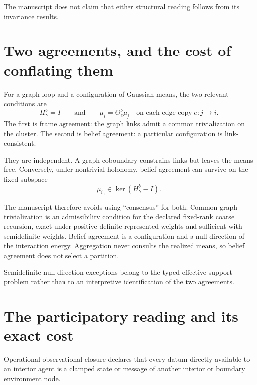 The manuscript does not claim that either structural reading follows from its
invariance results. 

\section{Two agreements, and the cost of conflating them}
\label{sec:phil-agreements}

For a graph loop and a configuration of Gaussian means, the two relevant
conditions are
\begin{equation}
H_\gamma^b=I
\qquad\text{and}\qquad
\mu_i=\Theta^b_e\mu_j\quad\text{on each edge copy }e:j\to i.
\label{eq:phil-two-agreements}
\end{equation}
The first is frame agreement: the graph links admit a common trivialization
on the cluster.  The second is belief agreement: a particular configuration
is link-consistent. 

They are independent. A graph coboundary constrains links but leaves the means
free. Conversely, under nontrivial holonomy, belief agreement can survive on
the fixed subspace
\begin{equation}
\mu_{i_0}\in\ker(H_\gamma^b-I).
\label{eq:phil-agreement-kernel}
\end{equation}

The manuscript therefore avoids using ``consensus'' for both.  Common graph
trivialization is an admissibility condition for the declared fixed-rank
coarse recursion, exact under positive-definite represented weights and
sufficient with semidefinite weights.  Belief agreement is a configuration
and a null direction of the interaction energy.  Aggregation never consults
the realized means, so belief agreement does not select a partition.

Semidefinite null-direction exceptions belong to the typed effective-support
problem rather than to an interpretive identification of the two agreements.

\section{The participatory reading and its exact cost}
\label{sec:phil-participatory}

Operational observational closure declares that every datum directly
available to an interior agent is a clamped state or message of another
interior or boundary environment node. 

